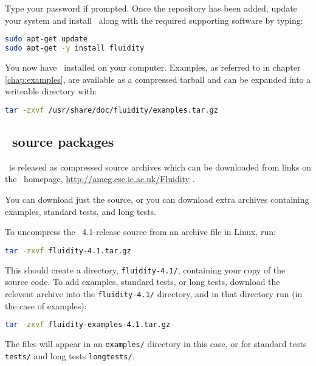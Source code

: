 Type your password if prompted. Once the repository has been added, update your
system and install \fluidity\ along with the required supporting software by
typing:

\begin{lstlisting}[language=Bash]
sudo apt-get update
sudo apt-get -y install fluidity
\end{lstlisting}

You now have \fluidity\ installed on your computer. Examples, as referred to in
chapter \ref{chap:examples}, are available as a compressed tarball and can be
expanded into a writeable directory with:

\begin{lstlisting}[language=Bash]
tar -zxvf /usr/share/doc/fluidity/examples.tar.gz
\end{lstlisting}

\subsection{\fluidity\ source packages}

\fluidity\ is released as compressed source archives which can be downloaded
from links on the \fluidity\ homepage,
\href{http://amcg.ese.ic.ac.uk/Fluidity}{http://amcg.ese.ic.ac.uk/Fluidity} .

You can download just the source, or you can download extra archives containing
examples, standard tests, and long tests.

To uncompress the \fluidity\ 4.1-release source from an archive file in Linux,
run:

\begin{lstlisting}[language=Bash]
tar -zxvf fluidity-4.1.tar.gz
\end{lstlisting}

This should create a directory, \lstinline[language=Bash]+fluidity-4.1/+,
containing your copy of the source code. To add examples, standard tests, or
long tests, download the relevent archive into the
\lstinline[language=Bash]+fluidity-4.1/+ directory, and in that directory run
(in the case of examples):

\begin{lstlisting}[language=Bash]
tar -zxvf fluidity-examples-4.1.tar.gz
\end{lstlisting}

The files will appear in an \lstinline[language=Bash]+examples/+ directory in
this case, or for standard tests \lstinline[language=Bash]+tests/+ and long
tests \lstinline[language=Bash]+longtests/+.

